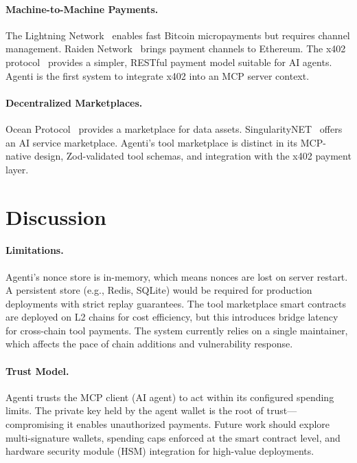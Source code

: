 \documentclass[11pt]{article}
\begin{document}
\paragraph{Machine-to-Machine Payments.} The Lightning Network~\cite{poon2016lightning} enables fast Bitcoin micropayments but requires channel management. Raiden Network~\cite{raiden} brings payment channels to Ethereum. The x402 protocol~\cite{coinbase2024x402} provides a simpler, RESTful payment model suitable for AI agents. Agenti is the first system to integrate x402 into an MCP server context.

\paragraph{Decentralized Marketplaces.} Ocean Protocol~\cite{ocean} provides a marketplace for data assets. SingularityNET~\cite{singularitynet} offers an AI service marketplace. Agenti's tool marketplace is distinct in its MCP-native design, Zod-validated tool schemas, and integration with the x402 payment layer.

\section{Discussion}
\label{sec:discussion}

\paragraph{Limitations.} Agenti's nonce store is in-memory, which means nonces are lost on server restart. A persistent store (e.g., Redis, SQLite) would be required for production deployments with strict replay guarantees. The tool marketplace smart contracts are deployed on L2 chains for cost efficiency, but this introduces bridge latency for cross-chain tool payments. The system currently relies on a single maintainer, which affects the pace of chain additions and vulnerability response.

\paragraph{Trust Model.} Agenti trusts the MCP client (AI agent) to act within its configured spending limits. The private key held by the agent wallet is the root of trust---compromising it enables unauthorized payments. Future work should explore multi-signature wallets, spending caps enforced at the smart contract level, and hardware security module (HSM) integration for high-value deployments.
\end{document}
